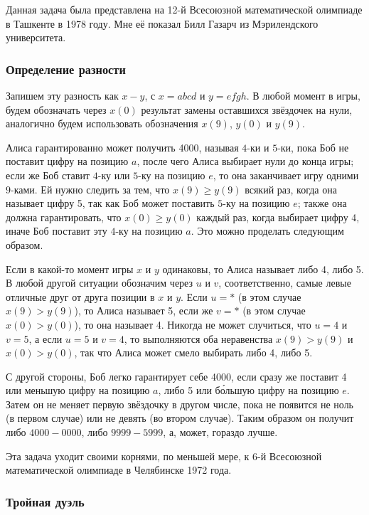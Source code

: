 Данная задача была представлена на 12-й Всесоюзной математической олимпиаде в Ташкенте в 1978 году.
Мне её показал Билл Газарч из Мэрилендского университета.%

\subsubsection*{Определение разности}%

Запишем эту разность как $x-y$, с $x=abcd$ и $y=efgh$.
В любой момент в игры, будем обозначать через $x(0)$ результат замены оставшихся звёздочек на нули, аналогично будем использовать обозначения $x(9)$, $y(0)$ и $y(9)$.

Алиса гарантированно может получить 4000, называя $4$-ки и $5$-ки, пока Боб не поставит цифру на позицию $a$, после чего Алиса выбирает нули до конца игры;
если же Боб ставит $4$-ку или $5$-ку на позицию $e$, то она заканчивает игру одними $9$-ками.
Ей нужно следить за тем, что $x(9)\ge y(9)$ всякий раз, когда она называет цифру 5, так как Боб может поставить $5$-ку на позицию $e$;
также она должна гарантировать, что $x(0)\ge y(0)$ каждый раз, когда выбирает цифру 4, иначе Боб поставит эту $4$-ку на позицию $a$.
Это можно проделать следующим образом.

Если в какой-то момент игры $x$ и $y$ одинаковы, то Алиса называет либо 4, либо 5.
В любой другой ситуации обозначим через $u$ и $v$, соответственно, самые левые отличные друг от друга позиции в $x$ и $y$.
Если $u=*$ (в этом случае $x(9)> y(9)$), то Алиса называет 5, если же $v=*$ (в этом случае $x(0)> y(0)$), то она называет 4.
Никогда не может случиться, что $u=4$ и $v=5$, а если $u=5$ и $v=4$, то выполняются оба неравенства $x(9)> y(9)$ и $x(0)> y(0)$, так что Алиса может смело выбирать либо 4, либо 5.

С другой стороны, Боб легко гарантирует себе 4000, если сразу же поставит 4 или меньшую цифру на позицию $a$, либо 5 или б\'{о}льшую цифру на позицию $e$.
Затем он не меняет первую звёздочку в другом числе, пока не появится не ноль (в первом случае) или не девять (во втором случае).
Таким образом он получит либо $4000-0000$, либо $9999-5999$, а, может, гораздо лучше.
\heart

Эта задача уходит своими корнями, по меньшей мере, к 6-й Всесоюзной математической олимпиаде в Челябинске 1972 года.

\subsubsection*{Тройная дуэль}%

